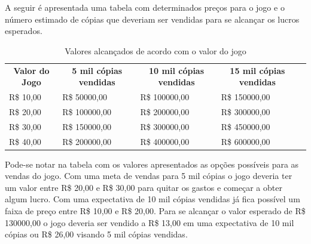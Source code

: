 \documentclass[11pt]{article} %
\begin{document}
A seguir é apresentada uma tabela com determinados preços para o jogo e o número estimado de cópias que deveriam ser vendidas para se alcançar os lucros esperados.

\begin{table}[h]
\begin{tabular}{|l|l|l|l|l}
\cline{1-4}
\multicolumn{1}{|c|}{\textbf{Valor do Jogo}} & \multicolumn{1}{c|}{\textbf{5 mil cópias vendidas}} & \multicolumn{1}{c|}{\textbf{10 mil cópias vendidas}} & \multicolumn{1}{c|}{\textbf{15 mil cópias vendidas}} &  \\ \cline{1-4}
R\$ 10,00                                    & R\$ 50000,00                                        & R\$ 100000,00                                        & R\$ 150000,00                                        &  \\ \cline{1-4}
R\$ 20,00                                    & R\$ 100000,00                                       & R\$ 200000,00                                        & R\$ 300000,00                                        &  \\ \cline{1-4}
R\$ 30,00                                    & R\$ 150000,00                                       & R\$ 300000,00                                        & R\$ 450000,00                                        &  \\ \cline{1-4}
R\$ 40,00                                    & R\$ 200000,00                                       & R\$ 400000,00                                        & R\$ 600000,00                                        &  \\ \cline{1-4}
\end{tabular}
\caption{Valores alcançados de acordo com o valor do jogo}
\end{table}

Pode-se notar na tabela com os valores apresentados as opções possíveis para as vendas do jogo. Com uma meta de vendas para 5 mil cópias o jogo deveria ter um valor entre R\$ 20,00 e R\$ 30,00 para quitar os gastos e começar a obter algum lucro. Com uma expectativa de 10 mil cópias vendidas já fica possível um faixa de preço entre R\$ 10,00 e R\$ 20,00. Para se alcançar o valor esperado de R\$ 130000,00 o jogo deveria ser vendido a R\$ 13,00 em uma expectativa de 10 mil cópias ou R\$ 26,00 visando 5 mil cópias vendidas.
\end{document}
